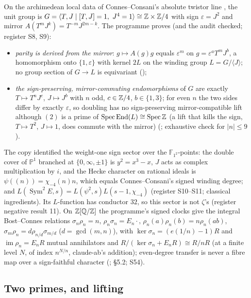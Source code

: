 On the archimedean local data of Connes--Consani's absolute twistor line \cite{CCtwistor}, the unit group is $G=\langle T,J\mid[T,J]=1,\ J^4=1\rangle\cong\ZZ\times\ZZ/4$ with sign $\varepsilon=J^2$ and mirror $A(T^mJ^k)=T^{-m}J^{2m-k}$. The programme proves (and the audit checked; register S8, S9):
\begin{itemize}
\item \emph{parity is derived from the mirror}: $g\mapsto A(g)g$ equals $\varepsilon^m$ on $g=\varepsilon^aT^mJ^b$, a homomorphism onto $\{1,\varepsilon\}$ with kernel $2L$ on the winding group $L=G/\langle J\rangle$; no group section of $G\to L$ is equivariant ();
\item \emph{the sign-preserving, mirror-commuting endomorphisms} of $G$ are exactly $T\mapsto T^nJ^c$, $J\mapsto J^b$ with $n$ odd, $c\in\mathbb{Z}/4$, $b\in\{1,3\}$; for even $n$ the two sides differ by exactly $\varepsilon$, so doubling has no sign-preserving mirror-compatible lift although $(2)$ is a prime of $\operatorname{Spec}\operatorname{End}(L)\cong\operatorname{Spec}\mathbb{Z}$ (a lift that kills the sign, $T\mapsto T^2$, $J\mapsto1$, does commute with the mirror) (; exhaustive check for $|n|\le9$).
\end{itemize}
The copy identified the weight-one sign sector over the $\mathbb{F}_{1^2}$-points: the double cover of $\mathbb{P}^1$ branched at $\{0,\infty,\pm1\}$ is $y^2=x^3-x$, $J$ acts as complex multiplication by $i$, and the Hecke character on rational ideals is $\psi((n))=\chi_{-4}(n)n$, which equals Connes--Consani's signed winding degree; and $L(\operatorname{Sym}^2E,s)=L(\psi^2,s)L(s-1,\chi_{-4})$ (register S10--S11; classical ingredients). Its $L$-function has conductor $32$, so this sector is not $\zeta$'s (register negative result 11).
On $\mathbb{Z}[\mathbb{Q}/\mathbb{Z}]$ the programme's signed clocks give the integral Bost--Connes relations $\sigma_n\rho_n=n$, $\rho_n\sigma_n=E_n\cdot$, $\rho_n(a)\rho_n(b)=n\rho_n(ab)$, $\sigma_m\rho_n=d\rho_{n/d}\sigma_{m/d}$ ($d=\gcd(m,n)$), with $\ker\sigma_n=(e(1/n)-1)R$ and $\operatorname{im}\rho_n=E_nR$ mutual annihilators and $R/(\ker\sigma_n+E_nR)\cong R/nR$ (at a finite level $N$, of index $n^{N/n}$, claude-ab's addition); even-degree transfer is never a fibre map over a sign-faithful character (;  §5.2; S54).

\subsection{Two primes, and lifting}


